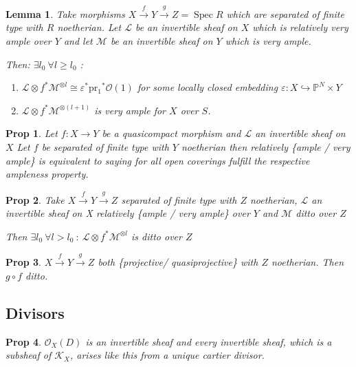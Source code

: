 \documentclass[a4paper, 12pt]{article}
\newcommand{\ca}[1]{\mathcal{#1}}
\newcommand{\cl}{\mathcal{L}}
\newcommand{\ox}{\mathcal{O}_X}
\newcommand{\bbp}{\mathbb{P}}
\newtheorem*{prop}{Prop}
\newtheorem*{lem}{Lemma}
\DeclareMathOperator{\spec}{Spec}
\begin{document}
	\begin{lem}
		Take morphisms $ X \xrightarrow{f} Y \xrightarrow{g} Z = \spec R $ which are separated of finite type with $ R $ noetherian. Let $ \cl $ be an invertible sheaf on $ X $ which is relatively very ample over $ Y $ and let $ \ca{M} $ be an invertible sheaf on $ Y $ which is very ample.
		
		Then: $ \exists l_0 \: \forall l \geq l_0 $ :
		\begin{enumerate}
			\item $ \cl \otimes f^*\ca{M}^{\otimes l} \cong \varepsilon ^*\mathrm{pr_1}^* \ca{O}(1) $ for some locally closed embedding $ \varepsilon: X \hookrightarrow \bbp^N\times Y $
			\item $ \cl \otimes f^* \ca{M}^{\otimes (l+1)} $ is very ample for $ X $ over $ S $.
		\end{enumerate}
	\end{lem}
	
	\begin{prop}
		Let $ f:X\rightarrow Y $ be a quasicompact morphism and $ \cl $ an invertible sheaf on $ X $
		Let $ f $ be separated of finite type with $ Y $ noetherian then relatively \{ample / very ample\} is equivalent to saying for all open coverings fulfill the respective ampleness property.
		
	\end{prop}
	
	\begin{prop}
		Take $ X \xrightarrow{f} Y \xrightarrow{g} Z $ separated of finite type with $ Z $ noetherian, $ \cl $ an invertible sheaf on X relatively \{ample / very ample\} over $ Y $ and $ \ca{M} $ ditto over $ Z $
		
		Then $ \exists l_0 \: \forall l > l_0 \: : \: \cl \otimes f^* \ca{M}^{\otimes l}  $ is ditto over $ Z $
	\end{prop}
	
	\begin{prop}
		$ X \xrightarrow{f} Y \xrightarrow{g} Z $ both \{projective/ quasiprojective\} with $ Z $ noetherian. Then $ g \circ f $ ditto.
	\end{prop}
	
		
	
	
	
	
	\subsection{Divisors}
	
	
	\begin{prop}
		$ \ox(D) $ is an invertible sheaf and every invertible sheaf, which is a subsheaf of $ \ca{K}_X $, arises like this from a unique cartier divisor.
	\end{prop}
	
\end{document}
